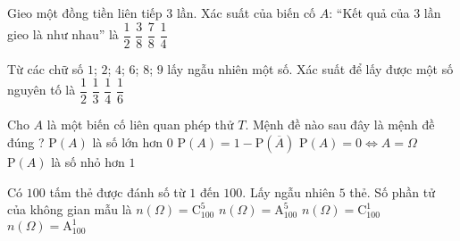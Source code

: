 \begin{ex}%
	Gieo một đồng tiền liên tiếp $3$ lần. Xác suất của biến cố $A$: “Kết quả của $3$ lần gieo là như nhau” là
	\choice
	{$\dfrac{1}{2}$}
	{$\dfrac{3}{8}$}
	{$\dfrac{7}{8}$}
	{\True $\dfrac{1}{4}$}
\end{ex}
\begin{ex}%
	Từ các chữ số $1$; $2$; $4$; $6$; $8$; $9$ lấy ngẫu nhiên một số. Xác suất để lấy được một số nguyên tố là
	\choice
	{$\dfrac{1}{2}$}
	{$\dfrac{1}{3}$}
	{$\dfrac{1}{4}$}
	{\True $\dfrac{1}{6}$}
\end{ex}
\begin{ex}%
	Cho $A$ là một biến cố liên quan phép thử $T$. Mệnh đề nào sau đây là mệnh đề đúng ?
	\choice
	{$\mathrm{P}(A)$ là số lớn hơn $0$}
	{\True $\mathrm{P}(A)=1-\mathrm{P}(\overline{A})$}
	{$\mathrm{P}(A)=0\Leftrightarrow A=\Omega$}
	{$\mathrm{P}(A)$ là số nhỏ hơn $1$}
\end{ex}
\begin{ex}%
	Có $100$ tấm thẻ được đánh số từ $1$ đến $100$. Lấy ngẫu nhiên $5$ thẻ. Số phần tử của không gian mẫu
	là
	\choice
	{\True $n(\Omega)=\mathrm{C}_{100}^5$}
	{$n(\Omega)=\mathrm{A}_{100}^5$}
	{$n(\Omega)=\mathrm{C}_{100}^1$}
	{$n(\Omega)=\mathrm{A}_{100}^1$}
\end{ex}
